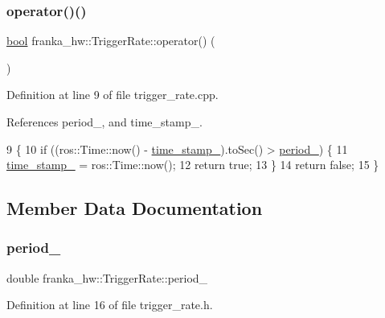 \subsubsection{\texorpdfstring{operator()()}{operator()()}}
{\footnotesize\ttfamily \hyperlink{classbool}{bool} franka\+\_\+hw\+::\+Trigger\+Rate\+::operator() (\begin{DoxyParamCaption}{ }\end{DoxyParamCaption})}



Definition at line 9 of file trigger\+\_\+rate.\+cpp.



References period\+\_\+, and time\+\_\+stamp\+\_\+.


\begin{DoxyCode}
9                              \{
10   \textcolor{keywordflow}{if} ((ros::Time::now() - \hyperlink{classfranka__hw_1_1TriggerRate_a6cbf0023238a654a03405b33ef8272b5}{time\_stamp\_}).toSec() > \hyperlink{classfranka__hw_1_1TriggerRate_a447516b7353ac0f006eac0ad6c76a0d1}{period\_}) \{
11     \hyperlink{classfranka__hw_1_1TriggerRate_a6cbf0023238a654a03405b33ef8272b5}{time\_stamp\_} = ros::Time::now();
12     \textcolor{keywordflow}{return} \textcolor{keyword}{true};
13   \}
14   \textcolor{keywordflow}{return} \textcolor{keyword}{false};
15 \}
\end{DoxyCode}


\subsection{Member Data Documentation}
\mbox{\label{classfranka__hw_1_1TriggerRate_a447516b7353ac0f006eac0ad6c76a0d1}} 
\subsubsection{\texorpdfstring{period\+\_\+}{period\_}}
{\footnotesize\ttfamily double franka\+\_\+hw\+::\+Trigger\+Rate\+::period\+\_\+\hspace{0.3cm}{\ttfamily [private]}}



Definition at line 16 of file trigger\+\_\+rate.\+h.



